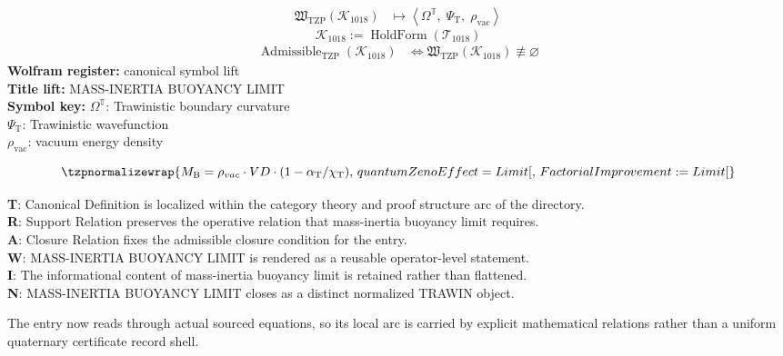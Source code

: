\noindent
\begin{minipage}[t]{0.48\linewidth}
\begingroup
\small
\[
\begin{aligned}
\mathfrak{W}_{\mathrm{TZP}}\!\left(\mathcal{K}_{1018}\right)
&\longmapsto
\left\langle \Omega^{\mathbb{T}},\; \Psi_{\mathrm{T}},\; \rho_{\mathrm{vac}} \right\rangle
\end{aligned}
\]
\[
\mathcal{K}_{1018}
:=
\operatorname{HoldForm}\!\left(\mathcal{T}_{1018}\right)
\]
\[
\begin{aligned}
\operatorname{Admissible}_{\mathrm{TZP}}\!\left(\mathcal{K}_{1018}\right)
&\Longleftrightarrow
\mathfrak{W}_{\mathrm{TZP}}\!\left(\mathcal{K}_{1018}\right)\not\equiv\varnothing
\end{aligned}
\]
\textbf{Wolfram register:} canonical symbol lift\\
\textbf{Title lift:} MASS-INERTIA BUOYANCY LIMIT\\
\textbf{Symbol key:} \(\Omega^{\mathbb{T}}\): Trawinistic boundary curvature\\ \(\Psi_{\mathrm{T}}\): Trawinistic wavefunction\\ \(\rho_{\mathrm{vac}}\): vacuum energy density
\par
\endgroup
\end{minipage}\hfill
\begin{minipage}[t]{0.48\linewidth}
\[
\tzpnormalizewrap{M_{\mathrm{B}} = \rho_{vac} \cdot VD \cdot (1 - \alpha_{\mathrm{T}}/\chi_{\mathrm{T}}),\,quantumZenoEffect = Limit[,\,FactorialImprovement := Limit[}
\]

\small
\textbf{T}: Canonical Definition is localized within the category theory and proof structure arc of the directory.\\
\textbf{R}: Support Relation preserves the operative relation that mass-inertia buoyancy limit requires.\\
\textbf{A}: Closure Relation fixes the admissible closure condition for the entry.\\
\textbf{W}: MASS-INERTIA BUOYANCY LIMIT is rendered as a reusable operator-level statement.\\
\textbf{I}: The informational content of mass-inertia buoyancy limit is retained rather than flattened.\\
\textbf{N}: MASS-INERTIA BUOYANCY LIMIT closes as a distinct normalized TRAWIN object.
\normalsize
\end{minipage}

The entry now reads through actual sourced equations, so its local arc is carried by explicit mathematical relations rather than a uniform quaternary certificate record shell.
\clearpage

